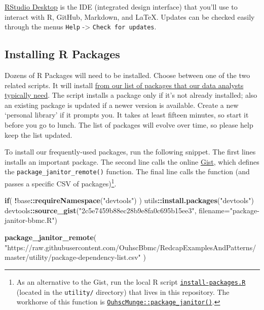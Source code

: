 \documentclass[
]{book}
\newenvironment{Shaded}{\begin{snugshade}}{\end{snugshade}}
\newcommand{\ControlFlowTok}[1]{\textcolor[rgb]{0.13,0.29,0.53}{\textbf{#1}}}
\newcommand{\DataTypeTok}[1]{\textcolor[rgb]{0.13,0.29,0.53}{#1}}
\newcommand{\KeywordTok}[1]{\textcolor[rgb]{0.13,0.29,0.53}{\textbf{#1}}}
\newcommand{\NormalTok}[1]{#1}
\newcommand{\OperatorTok}[1]{\textcolor[rgb]{0.81,0.36,0.00}{\textbf{#1}}}
\newcommand{\StringTok}[1]{\textcolor[rgb]{0.31,0.60,0.02}{#1}}
\begin{document}
\href{http://www.rstudio.com/ide/download/desktop}{RStudio Desktop} is the IDE (integrated design interface) that you'll use to interact with R, GitHub, Markdown, and LaTeX. Updates can be checked easily through the menus \texttt{Help} -\textgreater{} \texttt{Check\ for\ updates}.

\hypertarget{installing-r-packages}{%
\subsection{Installing R Packages}\label{installing-r-packages}}

Dozens of R Packages will need to be installed. Choose between one of the two related scripts. It will install \href{https://github.com/OuhscBbmc/RedcapExamplesAndPatterns/blob/master/utility/package-dependency-list.csv}{from our list of packages that our data analysts typically need}. The script installs a package only if it's not already installed; also an existing package is updated if a newer version is available. Create a new `personal library' if it prompts you. It takes at least fifteen minutes, so start it before you go to lunch. The list of packages will evolve over time, so please help keep the list updated.

To install our frequently-used packages, run the following snippet. The first lines installs an important package. The second line calls the online \href{https://gist.github.com/wibeasley/2c5e7459b88ec28b9e8fa0c695b15ee3}{Gist}, which defines the \texttt{package\_janitor\_remote()} function. The final line calls the function (and passes a specific CSV of packages)\footnote{As an alternative to the Gist, run the local R script \href{https://github.com/OuhscBbmc/RedcapExamplesAndPatterns/blob/master/utility/install-packages.R}{\texttt{install-packages.R}} (located in the \texttt{utility/} directory) that lives in this repository. The workhorse of this function is \href{https://github.com/OuhscBbmc/OuhscMunge/blob/master/R/package-janitor.R}{\texttt{OuhscMunge::package\_janitor()}}.}.

\begin{Shaded}
\begin{Highlighting}[]
\ControlFlowTok{if}\NormalTok{( }\OperatorTok{!}\NormalTok{base}\OperatorTok{::}\KeywordTok{requireNamespace}\NormalTok{(}\StringTok{"devtools"}\NormalTok{) ) utils}\OperatorTok{::}\KeywordTok{install.packages}\NormalTok{(}\StringTok{"devtools"}\NormalTok{)}
\NormalTok{devtools}\OperatorTok{::}\KeywordTok{source\_gist}\NormalTok{(}\StringTok{"2c5e7459b88ec28b9e8fa0c695b15ee3"}\NormalTok{, }\DataTypeTok{filename=}\StringTok{"package{-}janitor{-}bbmc.R"}\NormalTok{)}

\KeywordTok{package\_janitor\_remote}\NormalTok{(}
  \StringTok{"https://raw.githubusercontent.com/OuhscBbmc/RedcapExamplesAndPatterns/master/utility/package{-}dependency{-}list.csv"}
\NormalTok{)        }
\end{Highlighting}
\end{Shaded}
\end{document}
